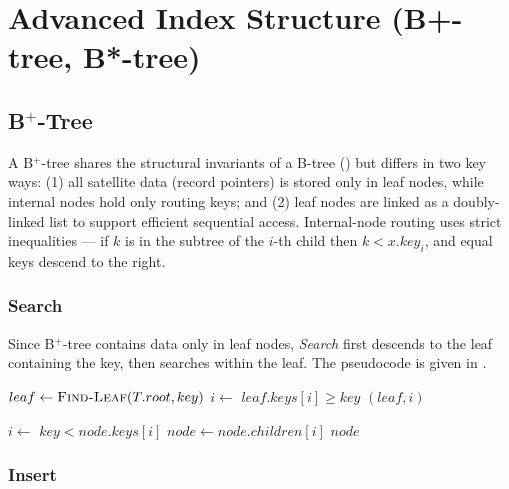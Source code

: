 \documentclass[sigconf]{acmart}
\begin{document}
\section{Advanced Index Structure (B+-tree, B*-tree)}
\subsection{B$^+$-Tree}
A B$^+$-tree shares the structural invariants of a B-tree () but differs in two key ways: (1) all satellite data (record pointers) is stored only in leaf nodes, while internal nodes hold only routing keys; and (2) leaf nodes are linked as a doubly-linked list to support efficient sequential access. Internal-node routing uses strict inequalities --- if $k$ is in the subtree of the $i$-th child then $k < x.key_i$, and equal keys descend to the right.

\subsubsection{Search}
Since B$^+$-tree contains data only in leaf nodes, \textit{Search} first descends to the leaf containing the key, then searches within the leaf. The pseudocode is given in .

\begin{algorithm}[tbp]
\caption{B+ Tree Search Algorithm}
\label{alg:bplus-search}
\begin{algorithmic}[1]
    \State $leaf \gets \Call{Find-Leaf}{T.root, key}$
    \State $i \gets$  $leaf.keys[i] \ge key$
        \State \Return $(leaf, i)$
    \EndIf
    \State \Return {}
\EndProcedure
\end{algorithmic}

\begin{algorithmic}[1]
        \State $i \gets$  $key < node.keys[i]$
        \State $node \gets node.children[i]$
    \EndWhile
    \State \Return $node$
\EndProcedure
\end{algorithmic}
\end{algorithm}

\subsubsection{Insert}
\end{document}
